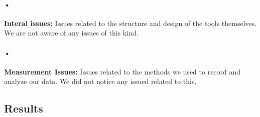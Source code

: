 \documentclass[twocolumn]{article}
\begin{document}
\paragraph{•}
	\textbf{Interal issues:} Issues related to the structure and design of the tools themselves. We are not aware of any issues of this kind.
\paragraph{•}
	\textbf{Measurement Issues:} Issues related to the methods we used to record and analyze our data. We did not notice any issued related to this.
	

	
\clearpage
\newpage

\subsection{Results}
\end{document}
